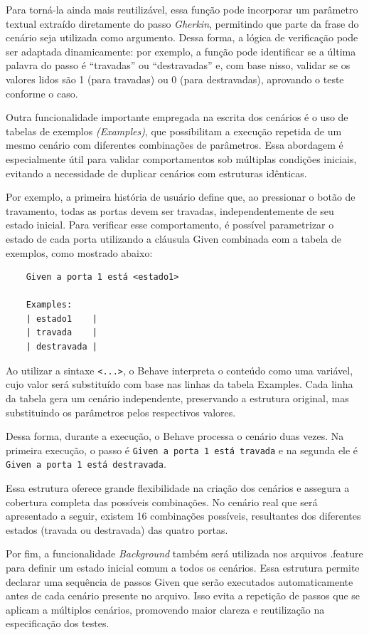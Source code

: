 Para torná-la ainda mais reutilizável, essa função pode incorporar um parâmetro textual extraído diretamente do passo \textit{Gherkin}, permitindo que parte da frase do 
cenário seja utilizada como argumento. Dessa forma, a lógica de verificação pode ser adaptada dinamicamente: por exemplo, a função pode identificar se a última 
palavra do passo é ``travadas'' ou ``destravadas'' e, com base nisso, validar se os valores lidos são 1 (para travadas) ou 0 (para destravadas), aprovando o teste 
conforme o caso.

Outra funcionalidade importante empregada na escrita dos cenários é o uso de tabelas de exemplos \textit{(Examples)}, que possibilitam a execução repetida de um mesmo 
cenário com diferentes combinações de parâmetros. Essa abordagem é especialmente útil para validar comportamentos sob múltiplas condições iniciais, evitando a 
necessidade de duplicar cenários com estruturas idênticas.

Por exemplo, a primeira história de usuário define que, ao pressionar o botão de travamento, todas as portas devem ser travadas, independentemente de seu estado 
inicial. Para verificar esse comportamento, é possível parametrizar o estado de cada porta utilizando a cláusula Given combinada com a tabela de exemplos, 
como mostrado abaixo:

\begin{verbatim}
    Given a porta 1 está <estado1>
    
    Examples:
    | estado1    |
    | travada    |
    | destravada |
\end{verbatim}


Ao utilizar a sintaxe \texttt{<...>}, o Behave interpreta o conteúdo como uma variável, cujo valor será substituído com base nas linhas da tabela Examples. Cada 
linha da tabela gera um cenário independente, preservando a estrutura original, mas substituindo os parâmetros pelos respectivos valores.

Dessa forma, durante a execução, o Behave processa o cenário duas vezes. Na primeira execução, o passo é \texttt{Given a porta 1 está travada} e na segunda 
ele é \texttt{Given a porta 1 está destravada}.

Essa estrutura oferece grande flexibilidade na criação dos cenários e assegura a cobertura completa das possíveis combinações. No cenário real que será apresentado 
a seguir, existem 16 combinações possíveis, resultantes dos diferentes estados (travada ou destravada) das quatro portas.

Por fim, a funcionalidade \textit{Background} também será utilizada nos arquivos .feature para definir um estado inicial comum a todos os cenários. Essa estrutura permite 
declarar uma sequência de passos Given que serão executados automaticamente antes de cada cenário presente no arquivo. Isso evita a repetição de passos que se 
aplicam a múltiplos cenários, promovendo maior clareza e reutilização na especificação dos testes.

